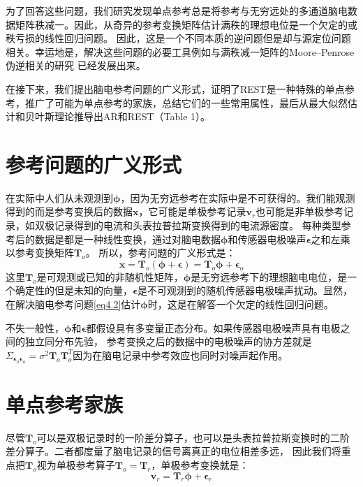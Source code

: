 为了回答这些问题，我们研究发现单点参考总是将参考与无穷远处的多通道脑电数据矩阵秩减一。因此，从奇异的参考变换矩阵估计满秩的理想电位是一个欠定的或秩亏损的线性回归问题。 因此，这是一个不同本质的逆问题但是却与源定位问题相关。幸运地是，解决这些问题的必要工具例如与满秩减一矩阵的Moore–Penrose伪逆相关的研究
已经发展出来。

在接下来，我们提出脑电参考问题的广义形式，证明了REST是一种特殊的单点参考，推广了可能为单点参考的家族，总结它们的一些常用属性，最后从最大似然估计和贝叶斯理论推导出AR和REST（Table 1）。

\section{参考问题的广义形式}
在实际中人们从未观测到$\mathbf{\phi}$，因为无穷远参考在实际中是不可获得的。我们能观测得到的而是参考变换后的数据$\mathbf{x}$，它可能是单极参考记录$\mathbf{v}_r$也可能是非单极参考记录，如双极记录得到的电流和头表拉普拉斯变换得到的电流源密度。 每种类型参考后的数据是都是一种线性变换，通过对脑电数据$\mathbf{\phi}$和传感器电极噪声$\mathbf{\epsilon}$之和左乘以参考变换矩阵$\mathbf{T}_o$。 所以，参考问题的广义形式是：
\begin{equation}\label{eq4.2}
\mathbf{x}=\mathbf{T}_{o}(\mathbf{\phi+\epsilon})=\mathbf{T}_{o}\mathbf{\phi}+\mathbf{\epsilon}_o
\end{equation}
这里$\mathbf{T}_o$是可观测或已知的非随机性矩阵，$\mathbf{\phi}$是无穷远参考下的理想脑电电位，是一个确定性的但是未知的向量，$\mathbf{\epsilon}$是不可观测到的随机传感器电极噪声扰动。显然，在解决脑电参考问题\eqref{eq4.2}估计$\mathbf{\phi}$时，这是在解答一个欠定的线性回归问题。 

不失一般性，$\mathbf{\phi}$和$\mathbf{\epsilon}$都假设具有多变量正态分布。如果传感器电极噪声具有电极之间的独立同分布先验，
参考变换之后的数据中的电极噪声的协方差就是$\Sigma_{\mathbf{\epsilon}_o\mathbf{\epsilon}_o}=\sigma^2\mathbf{T}_{o}\mathbf{T}_{o}^T$因为在脑电记录中参考效应也同时对噪声起作用。

\section{单点参考家族}
尽管$\mathbf{T}_{o}$可以是双极记录时的一阶差分算子，也可以是头表拉普拉斯变换时的二阶差分算子。二者都度量了脑电记录的信号离真正的电位相差多远，
因此我们将重点把$\mathbf{T}_{o}$视为单极参考算子$\mathbf{T}_{o}=\mathbf{T}_{r}$，单极参考变换就是：
\begin{equation}\label{eq4.3}
\mathbf{v}_{r}=\mathbf{T}_{r}\mathbf{\phi}+\mathbf{\epsilon}_r
\end{equation}

